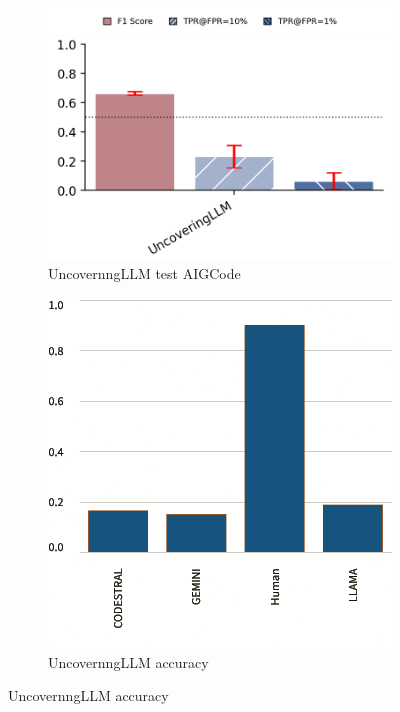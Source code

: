 \begin{figure}[H]
    \begin{subfigure}[b]{0.4\textwidth}
        \centering
        \includegraphics[width=\linewidth]{img/TEST/UncovernngLLM/AIG/rr.png}
        \caption{UncovernngLLM test AIGCode}
        \label{fig:c3}
    \end{subfigure}
    \hfill
    \begin{subfigure}[t]{0.4\textwidth}
        \centering
        \includegraphics[width=\linewidth]{img/TEST/UncovernngLLM/AIG/acc.png}
        \caption{UncovernngLLM accuracy }
        \label{fig:cc3}
    \end{subfigure}
\end{figure}

